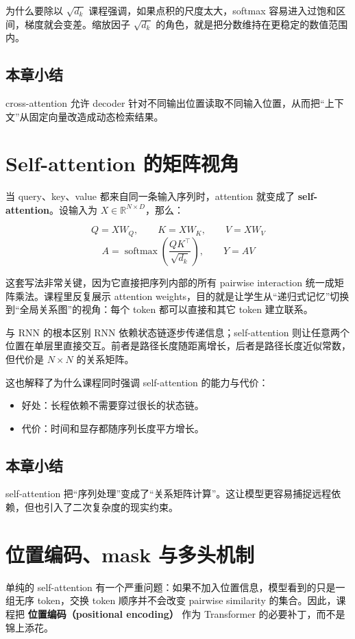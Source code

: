 \documentclass[a4paper]{article}
\begin{document}
\begin{importantbox}{为什么要除以 $\sqrt{d_k}$}
课程强调，如果点积的尺度太大，softmax 容易进入过饱和区间，梯度就会变差。缩放因子 $\sqrt{d_k}$ 的角色，就是把分数维持在更稳定的数值范围内。
\end{importantbox}

\subsection{本章小结}
cross-attention 允许 decoder 针对不同输出位置读取不同输入位置，从而把“上下文”从固定向量改造成动态检索结果。

\section{Self-attention 的矩阵视角}
当 query、key、value 都来自同一条输入序列时，attention 就变成了 \textbf{self-attention}。设输入为 $X \in \mathbb{R}^{N \times D}$，那么：

\[
Q = XW_Q,\qquad K = XW_K,\qquad V = XW_V
\]
\[
A = \operatorname{softmax}\!\left(\frac{QK^\top}{\sqrt{d_k}}\right),\qquad
Y = AV
\]

这套写法非常关键，因为它直接把序列内部的所有 pairwise interaction 统一成矩阵乘法。课程里反复展示 attention weights，目的就是让学生从“递归式记忆”切换到“全局关系图”的视角：每个 token 都可以直接和其它 token 建立联系。

\begin{knowledgebox}{与 RNN 的根本区别}
RNN 依赖状态链逐步传递信息；self-attention 则让任意两个位置在单层里直接交互。前者是路径长度随距离增长，后者是路径长度近似常数，但代价是 $N \times N$ 的关系矩阵。
\end{knowledgebox}

这也解释了为什么课程同时强调 self-attention 的能力与代价：
\begin{itemize}
\item 好处：长程依赖不需要穿过很长的状态链。
\item 代价：时间和显存都随序列长度平方增长。
\end{itemize}

\subsection{本章小结}
self-attention 把“序列处理”变成了“关系矩阵计算”。这让模型更容易捕捉远程依赖，但也引入了二次复杂度的现实约束。

\section{位置编码、mask 与多头机制}
单纯的 self-attention 有一个严重问题：如果不加入位置信息，模型看到的只是一组无序 token，交换 token 顺序并不会改变 pairwise similarity 的集合。因此，课程把 \textbf{位置编码（positional encoding）} 作为 Transformer 的必要补丁，而不是锦上添花。
\end{document}
